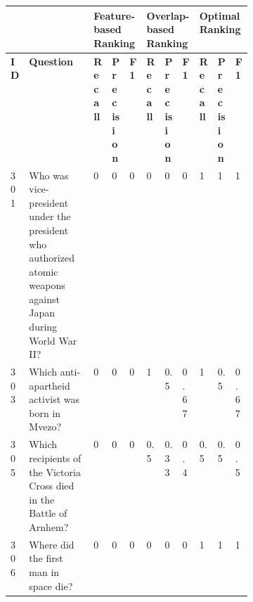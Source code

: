 \begin{table}[tb!]
\centering
\scriptsize

\begin{tabular}{@{}lp{0.4\linewidth}lllllllll@{}}
\toprule
         &                                                                                                             & \multicolumn{3}{l}{{\bf Feature-based Ranking}}     & \multicolumn{3}{l}{{\bf Overlap-based Ranking}}                                   & \multicolumn{3}{l}{{\bf Optimal Ranking}}                                      \\ \midrule
{\bf ID} & {\bf Question}                                                                                              & {\bf Recall}                & {\bf Precision}              & {\bf F1}             & {\bf Recall}              & {\bf Precision}           & {\bf F1}          & {\bf Recall}             & {\bf Precision}          & {\bf F1}         \\\midrule
301      & Who was vice-president under the president who authorized atomic weapons against Japan during World War II? & \cellcolor[HTML]{FFFE65}0   & \cellcolor[HTML]{FFFE65}0    & \cellcolor[HTML]{FFFE65}0    & \cellcolor[HTML]{FFFE65}0 & \cellcolor[HTML]{FFFE65}0 & \cellcolor[HTML]{FFFE65}0 & 1                        & 1                        & 1                        \\
303      & Which anti-apartheid activist was born in Mvezo?                                                            & \cellcolor[HTML]{F8A102}0   & \cellcolor[HTML]{F8A102}0    & \cellcolor[HTML]{F8A102}0    & 1                         & 0.5                       & 0.67                      & 1                        & 0.5                      & 0.67                     \\
305      & Which recipients of the Victoria Cross died in the Battle of Arnhem?                                        & \cellcolor[HTML]{F8A102}0   & \cellcolor[HTML]{F8A102}0    & \cellcolor[HTML]{F8A102}0    & 0.5                       & 0.33                      & 0.4                       & 0.5                      & 0.5                      & 0.5                      \\
306      & Where did the first man in space die?                                                                       & \cellcolor[HTML]{FFFE65}0   & \cellcolor[HTML]{FFFE65}0    & \cellcolor[HTML]{FFFE65}0    & \cellcolor[HTML]{FFFE65}0 & \cellcolor[HTML]{FFFE65}0 & \cellcolor[HTML]{FFFE65}0 & 1                        & 1                        & 1                        \\

\end{tabular}
\end{table}
